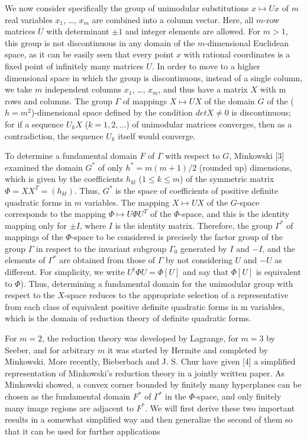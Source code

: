 \documentclass[10pt]{amsart}
\begin{document}
We now consider specifically the group of unimodular substitutions $x \mapsto Ux$ of $m$
real variables $x_1$, \dots, $x_m$ are combined into a column vector. Here, all $m$-row
matrices $U$ with determinant $\pm 1$ and integer elements are allowed. For $m > 1$, this
group is not discontinuous in any domain of the $m$-dimensional Euclidean space, as
it can be easily seen that every point $x$ with rational coordinates is a fixed point
of infinitely many matrices $U$. In order to move to a higher dimensional space in
which the group is discontinuous, instead of a single column, we take $m$ independent
columns $x_1$, \dots, $x_m$, and thus have a matrix $X$ with m rows and columns. The group
$\Gamma$ of mappings $X \mapsto UX$ of the domain $G$ of the ($h = m^2$)-dimensional
space defined by the condition $det X\not= 0$ is discontinuous; for if a sequence $U_k X$ ($k = 1, 2, \dots$)
of unimodular matrices converges, then as a contradiction, the sequence $U_k$ itself
would converge.

To determine a fundamental domain $F$ of $\Gamma$ with respect to $G$, Minkowski [3]
examined the domain $G^*$ of only $h^* = m(m + 1)/2$ (rounded up) dimensions,
which is given by the coefficients $h_{kl}$ ($1 \leq k \leq m$) of the symmetric matrix
$\Phi = X X^T = (h_{kl})$. Thus, $G^*$ is the space of coefficients of positive
definite quadratic forms in $m$ variables. The mapping $X \mapsto UX$ of the $G$-space
corresponds to the mapping $\Phi \mapsto U \Phi U^T$ of the $\Phi$-space, and this
is the identity mapping only for $\pm I$, where $I$ is the identity matrix.
Therefore, the group $\Gamma^*$ of mappings of the $\Phi$-space to be considered
is precisely the factor group of the group $\Gamma$ in respect to the invariant
subgroup $\Gamma_0$ generated by $I$ and $-I$, and the elements of $\Gamma^*$ are
obtained from those of $\Gamma$ by not considering $U$ and $-U$ as different.
For simplicity, we write $U^t \Phi U = \Phi[U]$ and say that $\Phi[U]$ is equivalent to $\Phi$).
Thus, determining a fundamental domain for the unimodular group with respect to the $X$-space reduces
to the appropriate selection of a representative from each class of equivalent positive
definite quadratic forms in m variables, which is the domain of reduction theory of
definite quadratic forms.

For $m = 2$, the reduction theory was developed by Lagrange, for $m = 3$ by Seeber, and for
arbitrary $m$ it was started by Hermite and completed by Minkowski.
More recently, Bieberbach and J. S. Chur have given [4] a simplified representation
of Minkowski’s reduction theory in a jointly written paper. As Minkowski showed,
a convex corner bounded by finitely many hyperplanes can be chosen as the fundamental domain $F^*$ of $\Gamma^*$
in the $\Phi$-space, and only finitely many image regions are adjacent to $F^*$.
We will first derive these two important results in a somewhat
simplified way and then generalize the second of them so that it can be used for
further applications
\end{document}

